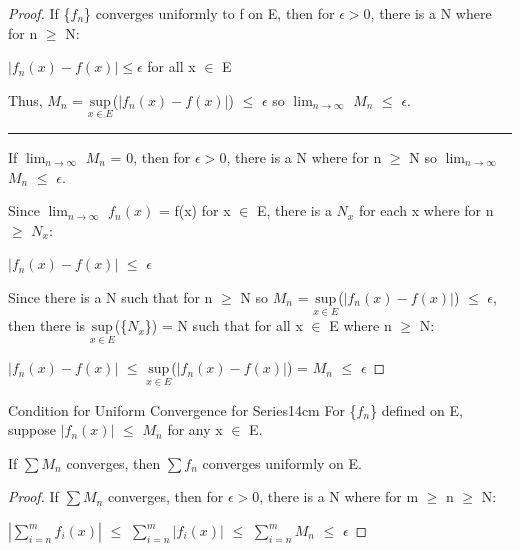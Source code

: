     \vspace{0.1cm}

    \begin{proof}
        If \{$f_n$\} converges uniformly to f on E, then
        for $\epsilon > 0$, there is a N where for n $\geq$ N:

        \hspace{0.5cm}
        $|f_n(x) - f(x)| \leq \epsilon$
        \hspace{1cm}
        for all x $\in$ E

        Thus, $M_n$ = $\underset{x \in E}{\text{sup}}$($|f_n(x) - f(x)|$)
        $\leq$ $\epsilon$ so $\lim_{n \rightarrow \infty}$ $M_n$ $\leq$ $\epsilon$.

        \rule[0.1cm]{15cm}{0.01cm}

        If $\lim_{n \rightarrow \infty}$ $M_n$ = 0, then for $\epsilon > 0$,
        there is a N where for n $\geq$ N so
        $\lim_{n \rightarrow \infty}$ $M_n$ $\leq$ $\epsilon$.

        Since $\lim_{n \rightarrow \infty}$ $f_n(x)$ = f(x) for x $\in$ E,
        there is a $N_x$ for each x where for n $\geq$ $N_x$:

        \hspace{0.5cm}
        $|f_n(x) - f(x)|$
        $\leq$ $\epsilon$

        Since there is a N such that for n $\geq$ N so $M_n$
        = $\underset{x \in E}{\text{sup}}$($|f_n(x) - f(x)|$) $\leq$ $\epsilon$,
        then there is $\underset{x \in E}{\text{sup}}$(\{$N_x$\}) = N
        such that for all x $\in$ E where n $\geq$ N:

        \hspace{0.5cm}
        $|f_n(x) - f(x)|$
        $\leq$ $\underset{x \in E}{\text{sup}}$($|f_n(x) - f(x)|$)
        = $M_n$ $\leq$ $\epsilon$
    \end{proof}

    \vspace{0.5cm}



    \begin{wtheorem}{Condition for Uniform Convergence for Series}{14cm}
        For \{$f_n$\} defined on E, suppose $|f_n(x)|$ $\leq$ $M_n$ for any x $\in$ E.

        If $\sum M_n$ converges, then $\sum f_n$ converges uniformly on E.        
    \end{wtheorem}
    
    \begin{proof}
        If $\sum M_n$ converges, then for $\epsilon > 0$, there is a N where
        for m $\geq$ n $\geq$ N:

        \hspace{0.5cm}
        $|\sum_{i=n}^m f_i(x)|$
        $\leq$ $\sum_{i=n}^m |f_i(x)|$
        $\leq$ $\sum_{i=n}^m M_n$
        $\leq$ $\epsilon$    
    \end{proof}

